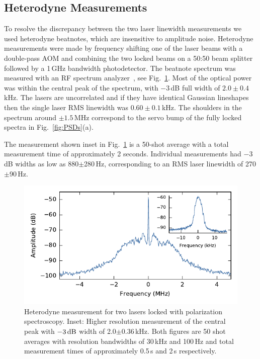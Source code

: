 \documentclass[10pt,letterpaper]{article}
\begin{document}
\subsection{Heterodyne Measurements}
To resolve the discrepancy between the two laser linewidth measurements we used heterodyne beatnotes, which are insensitive to amplitude noise.
Heterodyne measurements were made by frequency shifting one of the laser beams with a double-pass AOM and combining the two locked beams on a 50:50 beam splitter followed by a 1\,GHz bandwidth photodetector.
The beatnote spectrum was measured with an RF spectrum analyzer~\cite{equipment}, see Fig.~\ref{fig:beatnote}.
Most of the optical power was within the central peak of the spectrum, with $-3$\,dB full width of $2.0\pm0.4$\,kHz.
The lasers are uncorrelated and if they have identical Gaussian lineshapes then the single laser RMS linewidth was $0.60\pm0.1$\,kHz.
The shoulders in the spectrum around $\pm1.5$\,MHz correspond to the servo bump of the fully locked spectra in Fig.~\ref{fig:PSDs}(a).

The measurement shown inset in Fig.~\ref{fig:beatnote} is a 50-shot average with a total measurement time of approximately 2 seconds. Individual measurements had $-3$\,dB widths as low as 880$\pm$280\,Hz, corresponding to an RMS laser linewidth of 270$\pm$90\,Hz.

\begin{figure}[htbp]
\centering
\includegraphics{scholten_fig4.pdf}
\caption{Heterodyne measurement for two lasers locked with polarization spectroscopy.
Inset: Higher resolution measurement of the central peak with $-3\rm\,dB$ width of 2.0$\pm$0.36\,kHz.
Both figures are 50 shot averages with resolution bandwidths of 30\,kHz and 100\,Hz and total measurement times of approximately 0.5\,s and 2\,s respectively.\label{fig:beatnote}}
\end{figure}
\end{document}
